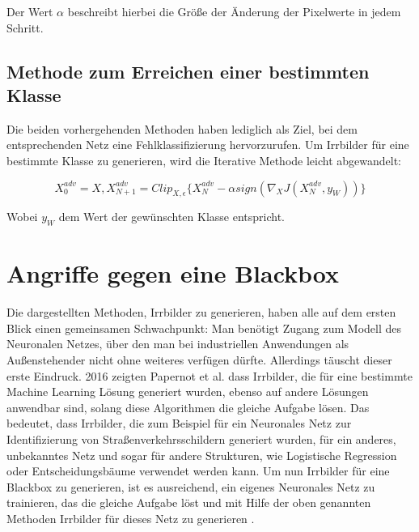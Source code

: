 Der Wert \(\alpha\) beschreibt hierbei die Größe der Änderung der Pixelwerte in jedem Schritt. 

\subsection{Methode zum Erreichen einer bestimmten Klasse}

Die beiden vorhergehenden Methoden haben lediglich als Ziel, bei dem entsprechenden Netz eine Fehlklassifizierung hervorzurufen. Um Irrbilder für eine bestimmte Klasse zu generieren, wird die Iterative Methode leicht abgewandelt:

\begin{equation}
X_0^{adv} = X, X_{N+1}^{adv} = Clip_{X, \epsilon} \{X_N^{adv} - \alpha sign(\nabla_X J(X_N^{adv}, y_{W})) \}
\end{equation}

Wobei \(y_W\) dem Wert der gewünschten Klasse entspricht.

\section{Angriffe gegen eine Blackbox}
Die dargestellten Methoden, Irrbilder zu generieren, haben alle auf dem ersten Blick einen gemeinsamen Schwachpunkt:
Man benötigt Zugang zum Modell des Neuronalen Netzes, über den man bei industriellen Anwendungen als Außenstehender nicht ohne weiteres verfügen dürfte.
Allerdings täuscht dieser erste Eindruck.
2016 zeigten Papernot et al. \cite{journals/corr/PapernotMG16} dass Irrbilder, die für eine bestimmte Machine Learning Lösung generiert wurden, ebenso auf andere Lösungen anwendbar sind, solang diese Algorithmen die gleiche Aufgabe lösen. Das bedeutet, dass Irrbilder, die zum Beispiel für ein Neuronales Netz zur Identifizierung von Straßenverkehrsschildern generiert wurden, für ein anderes, unbekanntes Netz und sogar für andere Strukturen, wie Logistische Regression oder Entscheidungsbäume verwendet werden kann.
Um nun Irrbilder für eine Blackbox zu generieren, ist es ausreichend, ein eigenes Neuronales Netz zu trainieren, das die gleiche Aufgabe löst und mit Hilfe der oben genannten Methoden Irrbilder für dieses Netz zu generieren \cite{conf/ccs/PapernotMGJCS17}.
